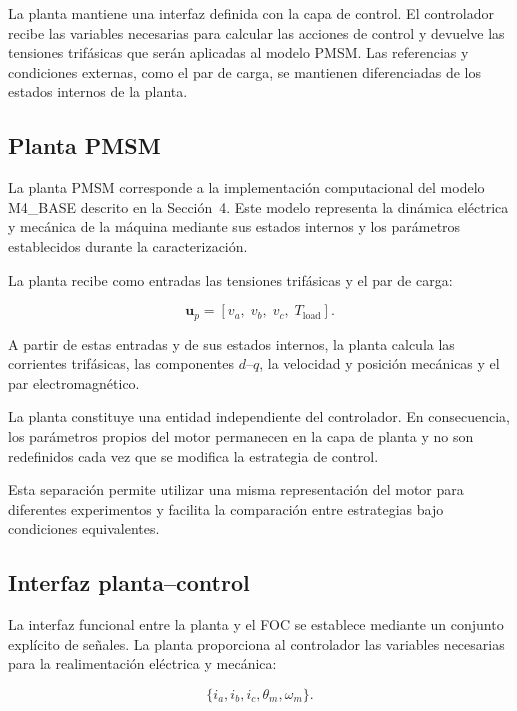 La planta mantiene una interfaz definida con la capa de control. El controlador recibe las variables necesarias para calcular las acciones de control y devuelve las tensiones trifásicas que serán aplicadas al modelo PMSM. Las referencias y condiciones externas, como el par de carga, se mantienen diferenciadas de los estados internos de la planta.

\subsection{Planta PMSM}

La planta PMSM corresponde a la implementación computacional del modelo M4\_BASE descrito en la Sección~4. Este modelo representa la dinámica eléctrica y mecánica de la máquina mediante sus estados internos y los parámetros establecidos durante la caracterización.

La planta recibe como entradas las tensiones trifásicas y el par de carga:

\begin{equation}
\mathbf{u}_{p}
=
[v_a,\;v_b,\;v_c,\;T_{\mathrm{load}}].
\end{equation}

A partir de estas entradas y de sus estados internos, la planta calcula las corrientes trifásicas, las componentes $d$--$q$, la velocidad y posición mecánicas y el par electromagnético.

La planta constituye una entidad independiente del controlador. En consecuencia, los parámetros propios del motor permanecen en la capa de planta y no son redefinidos cada vez que se modifica la estrategia de control.

Esta separación permite utilizar una misma representación del motor para diferentes experimentos y facilita la comparación entre estrategias bajo condiciones equivalentes.

\subsection{Interfaz planta--control}

La interfaz funcional entre la planta y el FOC se establece mediante un conjunto explícito de señales. La planta proporciona al controlador las variables necesarias para la realimentación eléctrica y mecánica:

\begin{equation}
\{i_a,i_b,i_c,\theta_m,\omega_m\}.
\end{equation}

